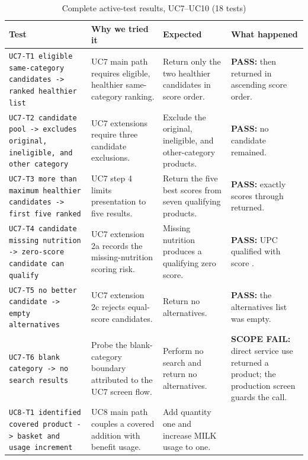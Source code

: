 \documentclass[sigconf]{acmart}
\begin{document}
\begin{table}[!p]
  \caption{Complete active-test results, UC7--UC10 (18 tests)}
  \label{tab:complete-results-3}
  \centering
  \tiny
  \setlength{\tabcolsep}{2.5pt}
  \renewcommand{\arraystretch}{0.91}
  \begin{tabular}{@{}L{0.26\textwidth}L{0.21\textwidth}L{0.20\textwidth}L{0.27\textwidth}@{}}
    \toprule
    Test & Why we tried it & Expected & What happened \\
    \midrule
    \texttt{UC7-T1 eligible same-category candidates -> ranked healthier list}
      & UC7 main path requires eligible, healthier same-category ranking.
      & Return only the two healthier candidates in score order.
      & \textbf{PASS:}  then  returned in ascending score order. \\
    \texttt{UC7-T2 candidate pool -> excludes original, ineligible, and other category}
      & UC7 extensions require three candidate exclusions.
      & Exclude the original, ineligible, and other-category products.
      & \textbf{PASS:} no candidate remained. \\
    \texttt{UC7-T3 more than maximum healthier candidates -> first five ranked}
      & UC7 step 4 limits presentation to five results.
      & Return the five best scores from seven qualifying products.
      & \textbf{PASS:} exactly scores  through  returned. \\
    \texttt{UC7-T4 candidate missing nutrition -> zero-score candidate can qualify}
      & UC7 extension 2a records the missing-nutrition scoring risk.
      & Missing nutrition produces a qualifying zero score.
      & \textbf{PASS:} UPC  qualified with score . \\
    \texttt{UC7-T5 no better candidate -> empty alternatives}
      & UC7 extension 2c rejects equal-score candidates.
      & Return no alternatives.
      & \textbf{PASS:} the alternatives list was empty. \\
    \texttt{UC7-T6 blank category -> no search results}
      & Probe the blank-category boundary attributed to the UC7 screen flow.
      & Perform no search and return no alternatives.
      & \textbf{SCOPE FAIL:} direct service use returned a product; the production screen guards the call. \\
    \texttt{UC8-T1 identified covered product -> basket and usage increment}
      & UC8 main path couples a covered addition with benefit usage.
      & Add quantity one and increase MILK usage to one.

\end{tabular}
\end{table}
\end{document}
